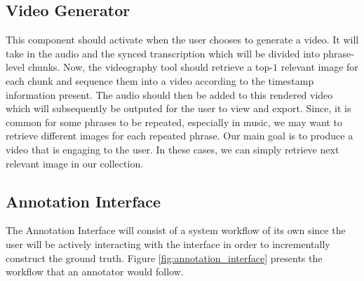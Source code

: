 \documentclass{l4proj}
\begin{document}
\subsection{Video Generator}
This component should activate when the user chooses to generate a video. It will take in the audio and the synced transcription which will be divided into phrase-level chunks. Now, the videography tool should retrieve a top-$1$ relevant image for each chunk and sequence them into a video according to the timestamp information present. The audio should then be added to this rendered video which will subsequently be outputed for the user to view and export. Since, it is common for some phrases to be repeated, especially in music, we may want to retrieve different images for each repeated phrase. Our main goal is to produce a video that is engaging to the user. In these cases, we can simply retrieve next relevant image in our collection.


\subsection{Annotation Interface}
The Annotation Interface will consist of a system workflow of its own since the user will be actively interacting with the interface in order to incrementally construct the ground truth. Figure \ref{fig:annotation_interface} presents the workflow that an annotator would follow.
\end{document}
